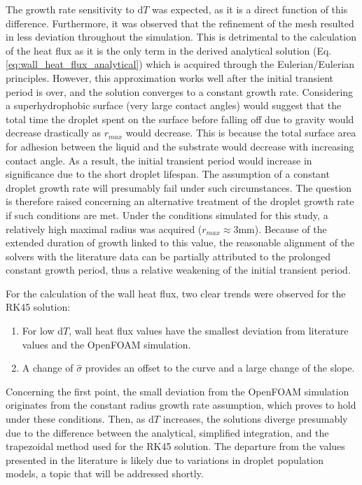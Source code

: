 \documentclass[12pt]{article}
\numberwithin{equation}{section}
\begin{document}
The growth rate sensitivity to $\mathrm{d}T$ was expected, as it is a direct function of this difference. Furthermore, it was observed that the refinement of the mesh resulted in less deviation throughout the simulation. This is detrimental to the calculation of the heat flux as it is the only term in the derived analytical solution (Eq. \ref{eq:wall_heat_flux_analytical}) which is acquired through the Eulerian/Eulerian principles. However, this approximation works well after the initial transient period is over, and the solution converges to a constant growth rate. Considering a superhydrophobic surface (very large contact angles) would suggest that the total time the droplet spent on the surface before falling off due to gravity would decrease drastically as $r_{max}$ would decrease. This is because the total surface area for adhesion between the liquid and the substrate would decrease with increasing contact angle. As a result, the initial transient period would increase in significance due to the short droplet lifespan. The assumption of a constant droplet growth rate will presumably fail under such circumstances. The question is therefore raised concerning an alternative treatment of the droplet growth rate if such conditions are met. Under the conditions simulated for this study, a relatively high maximal radius was acquired ($r_{max}\approx 3\mathrm{mm}$). Because of the extended duration of growth linked to this value, the reasonable alignment of the solvers with the literature data can be partially attributed to the prolonged constant growth period, thus a relative weakening of the initial transient period.

For the calculation of the wall heat flux, two clear trends were observed for the RK45 solution: 
\begin{enumerate}
    \item For low $\mathrm{d}T$, wall heat flux values have the smallest deviation from literature values and the OpenFOAM simulation.
    \item A change of $\hat{\sigma}$ provides an offset to the curve and a large change of the slope.
\end{enumerate}
Concerning the first point, the small deviation from the OpenFOAM simulation originates from the constant radius growth rate assumption, which proves to hold under these conditions. Then, as $\mathrm{d}T$ increases, the solutions diverge presumably due to the difference between the analytical, simplified integration, and the trapezoidal method used for the RK45 solution. 
The departure from the values presented in the literature is likely due to variations in droplet population models, a topic that will be addressed shortly.
\end{document}
